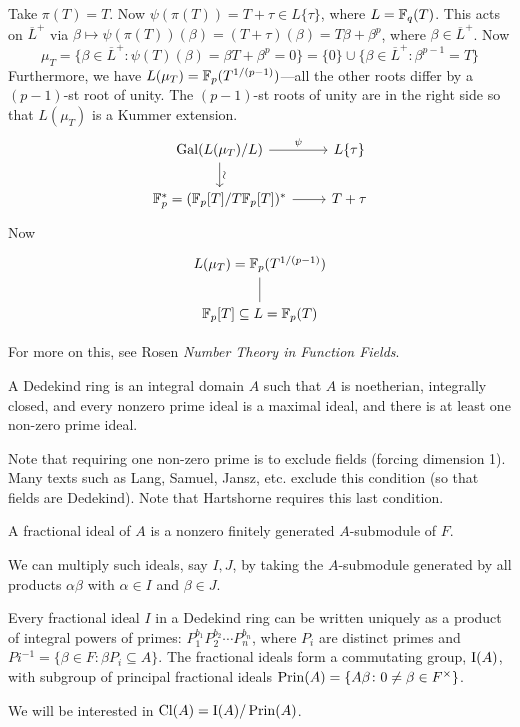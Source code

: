 \begin{ex}
Take $\pi(T)=T$. Now $\psi(\pi(T))=T+\tau \in L\{\tau\}$, where $L=\mathbb{F}_q(T)$. This acts on $\overline{L}^+$ via $\beta \mapsto \psi(\pi(T))(\beta)=(T+\tau)(\beta)=T\beta+\beta^p$, where $\beta \in \overline{L}^+$. Now
	\[
	\mu_T=\{ \beta\in \overline{L}^+ \colon \psi(T)(\beta)=\beta T+\beta^p=0\} =\{0\} \cup \{\beta \in \overline{L}^+ \colon \beta^{p-1}=T\}
	\]
Furthermore, we have $L(\mu_T)=\mathbb{F}_p(T^{1/(p-1)})$---all the other roots differ by a $(p-1)$-st root of unity. The $(p-1)$-st roots of unity are in the right side so that $L(\mu_T)$ is a Kummer extension. 
	\[
	\begin{tikzcd}
	\Gal(L(\mu_T)/L) \isoarrow{d} \arrow{r}{\psi} & L\{\tau\} \\
	\F_p^*=(\F_p[T]/T\F_p[T])^* \arrow{r} & T+ \tau
	\end{tikzcd}
	\]
Now 
	\[
	\begin{tikzcd}
	L(\mu_T)=\F_p(T^{1/(p-1)}) \arrow[dash]{d} \\
	\F_p[T] \subseteq L=\F_p(T)
	\end{tikzcd}
	\]

For more on this, see Rosen \emph{Number Theory in Function Fields}.
\end{ex}

\begin{dfn}
A Dedekind ring is an integral domain $A$ such that $A$ is noetherian, integrally closed, and every nonzero prime ideal is a maximal ideal, and there is at least one non-zero prime ideal.
\end{dfn}

Note that requiring one non-zero prime is to exclude fields (forcing dimension 1). Many texts such as Lang, Samuel, Jansz, etc. exclude this condition (so that fields are Dedekind). Note that Hartshorne requires this last condition. 

\begin{dfn}
A fractional ideal of $A$ is a nonzero finitely generated $A$-submodule of $F$. 
\end{dfn}

We can multiply such ideals, say $I,J$, by taking the $A$-submodule generated by all products $\alpha \beta$ with $\alpha \in I$ and $\beta \in J$.

\begin{thm}
Every fractional ideal $I$ in a Dedekind ring can be written uniquely as a product of integral powers of primes: $P_1^{b_1}P_2^{b_2} \cdots P_n^{b_n}$, where $P_i$ are distinct primes and $Pi^{-1}=\{ \beta \in F \colon \beta P_i \subseteq A\}$. The fractional ideals form a commutating group, $\operatorname{I}(A)$, with subgroup of principal fractional ideals $\operatorname{Prin}(A)=\{A \beta \colon 0 \neq \beta \in F^\times\}$. 
\end{thm}

We will be interested in $\operatorname{Cl}(A)=\operatorname{I}(A)/\operatorname{Prin}(A)$.
